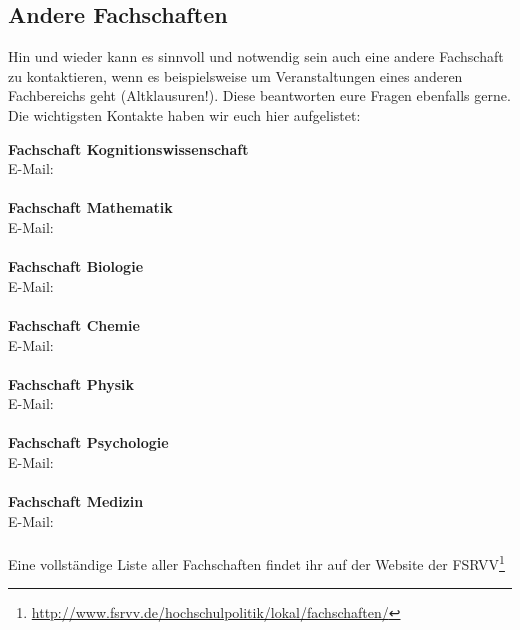 

\vfill
\subsection{Andere Fachschaften}
Hin und wieder kann es sinnvoll und notwendig sein auch eine andere Fachschaft
zu kontaktieren, wenn es beispielsweise um Veranstaltungen eines anderen
Fachbereichs geht (Altklausuren!). Diese beantworten eure Fragen ebenfalls
gerne. Die wichtigsten Kontakte haben wir euch hier aufgelistet:

\textbf{Fachschaft Kognitionswissenschaft}\\
E-Mail: \\
\\
\textbf{Fachschaft Mathematik}\\
E-Mail: \\
\\
\textbf{Fachschaft Biologie}\\
E-Mail: \\
\\
\textbf{Fachschaft Chemie}\\
E-Mail: \\
\\
\textbf{Fachschaft Physik}\\
E-Mail: \\
\\
\textbf{Fachschaft Psychologie}\\
E-Mail: \\
\\
\textbf{Fachschaft Medizin}\\
E-Mail: \\
\\
Eine vollständige Liste aller Fachschaften findet ihr auf der Website der
FSRVV\footnote{\url{http://www.fsrvv.de/hochschulpolitik/lokal/fachschaften/}}

\vfill

